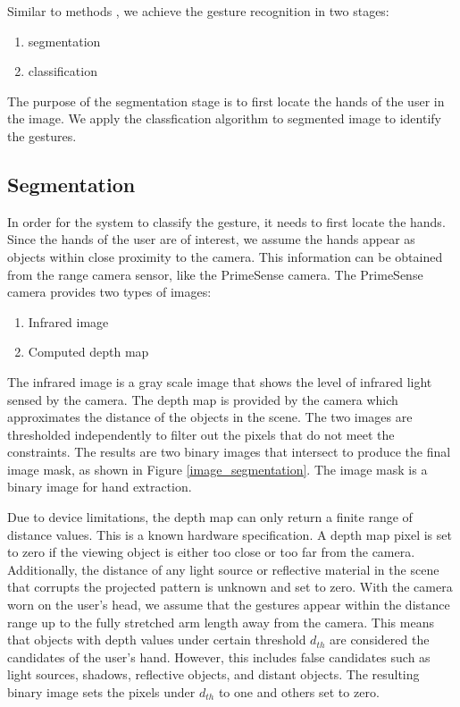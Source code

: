 \documentclass[conference]{IEEEtran}
\begin{document}
Similar to methods \cite{li2009real, kjeldsen1996toward, ren2011robust, uebersax2011real}, we achieve the gesture recognition in two stages:
\begin{enumerate}
\item segmentation
\item classification
\end{enumerate}

The purpose of the segmentation stage is to first locate the hands of the user in the image. We apply the classfication algorithm to segmented image to identify the gestures.

\subsection{Segmentation}
In order for the system to classify the gesture, it needs to first locate the hands. Since the hands of the user are of interest, we assume the hands appear as objects within close proximity to the camera. This information can be obtained from the range camera sensor, like the PrimeSense camera. The PrimeSense camera provides two types of images:
\begin{enumerate}
\item Infrared image
\item Computed depth map
\end{enumerate}
The infrared image is a gray scale image that shows the level of infrared light sensed by the camera. The depth map is provided by the camera which approximates the distance of the objects in the scene. The two images are thresholded independently to filter out the pixels that do not meet the constraints. The results are two binary images that intersect to produce the final image mask, as shown in Figure \ref{image_segmentation}. The image mask is a binary image for hand extraction.

Due to device limitations, the depth map can only return a finite range of distance values. This is a known hardware specification. A depth map pixel is set to zero if the viewing object is either too close or too far from the camera. Additionally, the distance of any light source or reflective material in the scene that corrupts the projected pattern is unknown and set to zero. With the camera worn on the user's head, we assume that the gestures appear within the distance range up to the fully stretched arm length away from the camera. This means that objects with depth values under certain threshold $d_{th}$ are considered the candidates of the user's hand. However, this includes false candidates such as light sources, shadows, reflective objects, and distant objects. The resulting binary image sets the pixels under $d_{th}$ to one and others set to zero.
\end{document}
